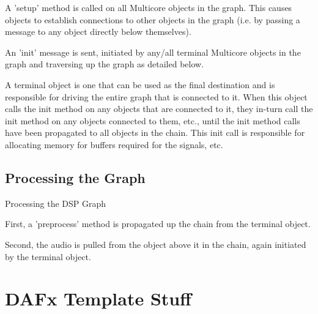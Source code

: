 \documentclass[twoside,a4paper]{article}
\begin{document}
A 'setup' method is called on all Multicore objects in the graph. This causes objects to establish connections to other objects in the graph (i.e. by passing a message to any object directly below themselves).

An 'init' message is sent, initiated by any/all terminal Multicore objects in the graph and traversing up the graph as detailed below.

A terminal object is one that can be used as the final destination and is responsible for driving the entire graph that is connected to it. When this object calls the init method on any objects that are connected to it, they in-turn call the init method on any objects connected to them, etc., until the init method calls have been propagated to all objects in the chain. This init call is responsible for allocating memory for buffers required for the signals, etc.



\subsection{Processing the Graph} %

Processing the DSP Graph

First, a 'preprocess' method is propagated up the chain from the terminal object.

Second, the audio is pulled from the object above it in the chain, again initiated by the terminal object.







\section{DAFx Template Stuff}
\end{document}
